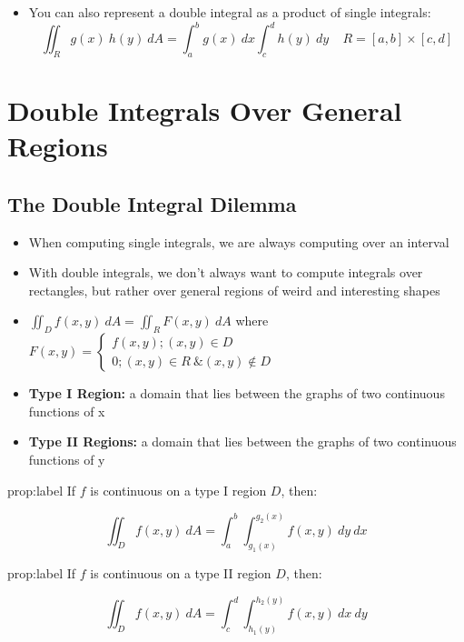 \documentclass{package/notes}
\begin{document}
\begin{itemize}
	\item You can also represent a double integral as a product of single integrals:
	$$\iint_R g(x)\:h(y)\:dA=\int_a^bg(x)\:dx\int_c^dh(y)\:dy\:\:\:\:\:R=[a,b]\times[c,d]$$
\end{itemize}



\section{Double Integrals Over General Regions}

\subsection{The Double Integral Dilemma}

\begin{itemize}
	\item When computing single integrals, we are always computing over an interval
	\item With double integrals, we don't always want to compute integrals over rectangles, but rather over general regions of weird and interesting shapes
	\item $\iint_Df(x,y)\:dA=\iint_RF(x,y)\:dA$ where $F(x,y) = \begin{cases}f(x,y); (x,y)\in D\\0;(x,y)\in R \:\&(x,y)\notin D\end{cases}$
	\item \textbf{Type I Region:} a domain that lies between the graphs of two continuous functions of x
	\item \textbf{Type II Regions:} a domain that lies between the graphs of two continuous functions of y
\end{itemize}

\begin{proposition}{prop:label}
	If $f$ is continuous on a type I region $D$, then:

	$$\iint_Df(x,y)\:dA=\int_a^b\int_{g_1(x)}^{g_2(x)}f(x,y)\:dy\:dx$$
\end{proposition}

\begin{proposition}{prop:label}
	If $f$ is continuous on a type II region $D$, then:

	$$\iint_Df(x,y)\:dA=\int_c^d\int_{h_1(y)}^{h_2(y)}f(x,y)\:dx\:dy$$
\end{proposition}
\end{document}
